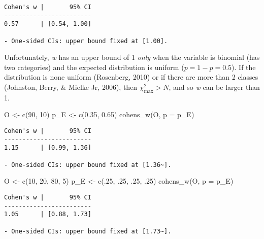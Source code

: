 \documentclass[
]{article}
\newenvironment{Shaded}{\begin{snugshade}}{\end{snugshade}}
\newcommand{\AttributeTok}[1]{\textcolor[rgb]{0.77,0.63,0.00}{#1}}
\newcommand{\DecValTok}[1]{\textcolor[rgb]{0.00,0.00,0.81}{#1}}
\newcommand{\FloatTok}[1]{\textcolor[rgb]{0.00,0.00,0.81}{#1}}
\newcommand{\FunctionTok}[1]{\textcolor[rgb]{0.00,0.00,0.00}{#1}}
\newcommand{\NormalTok}[1]{#1}
\newcommand{\OtherTok}[1]{\textcolor[rgb]{0.56,0.35,0.01}{#1}}
\begin{document}
\begin{verbatim}
Cohen's w |       95% CI
------------------------
0.57      | [0.54, 1.00]

- One-sided CIs: upper bound fixed at [1.00].
\end{verbatim}

Unfortunately, \emph{w} has an upper bound of 1 \emph{only} when the
variable is binomial (has two categories) and the expected distribution
is uniform (\(p = 1 - p = 0.5\)). If the distribution is none uniform
(Rosenberg, 2010) or if there are more than 2 classes (Johnston, Berry,
\& Mielke Jr, 2006), then \(\chi^2_\text{max} > N\), and so \emph{w} can
be larger than 1.

\begin{Shaded}
\begin{Highlighting}[]
\NormalTok{O }\OtherTok{\textless{}{-}} \FunctionTok{c}\NormalTok{(}\DecValTok{90}\NormalTok{, }\DecValTok{10}\NormalTok{)}
\NormalTok{p\_E }\OtherTok{\textless{}{-}} \FunctionTok{c}\NormalTok{(}\FloatTok{0.35}\NormalTok{, }\FloatTok{0.65}\NormalTok{)}
\FunctionTok{cohens\_w}\NormalTok{(O, }\AttributeTok{p =}\NormalTok{ p\_E)}
\end{Highlighting}
\end{Shaded}

\begin{verbatim}
Cohen's w |       95% CI
------------------------
1.15      | [0.99, 1.36]

- One-sided CIs: upper bound fixed at [1.36~].
\end{verbatim}

\begin{Shaded}
\begin{Highlighting}[]
\NormalTok{O }\OtherTok{\textless{}{-}} \FunctionTok{c}\NormalTok{(}\DecValTok{10}\NormalTok{, }\DecValTok{20}\NormalTok{, }\DecValTok{80}\NormalTok{, }\DecValTok{5}\NormalTok{)}
\NormalTok{p\_E }\OtherTok{\textless{}{-}} \FunctionTok{c}\NormalTok{(.}\DecValTok{25}\NormalTok{, .}\DecValTok{25}\NormalTok{, .}\DecValTok{25}\NormalTok{, .}\DecValTok{25}\NormalTok{)}
\FunctionTok{cohens\_w}\NormalTok{(O, }\AttributeTok{p =}\NormalTok{ p\_E)}
\end{Highlighting}
\end{Shaded}

\begin{verbatim}
Cohen's w |       95% CI
------------------------
1.05      | [0.88, 1.73]

- One-sided CIs: upper bound fixed at [1.73~].
\end{verbatim}
\end{document}
